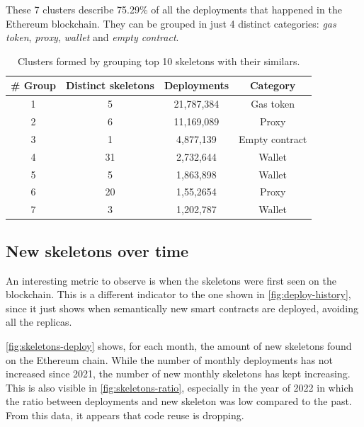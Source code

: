 These 7 clusters describe 75.29\% of all the deployments that happened in the Ethereum blockchain. They can be grouped in just 4 distinct categories: \textit{gas token}, \textit{proxy}, \textit{wallet} and \textit{empty contract}.

\begin{table}[H]
\centering
    \begin{threeparttable}
    \begin{tabular}{ c c c c } 
    \toprule
    \textbf{\# Group} & \textbf{Distinct skeletons} & \textbf{Deployments} & \textbf{Category} \\
    \midrule  
    1 & 5 & 21,787,384 & Gas token \\ [1.2ex]
    2 & 6 & 11,169,089 & Proxy \\ [1.2ex]
    3 & 1 & 4,877,139 & Empty contract \\ [1.2ex]
    4 & 31 & 2,732,644 & Wallet \\ [1.2ex]
    5 & 5 & 1,863,898 & Wallet \\ [1.2ex]
    6 & 20 & 1,55,2654 & Proxy \\ [1.2ex]
    7 & 3 & 1,202,787 & Wallet \\ [1.2ex]
    \bottomrule
    \end{tabular}
    \end{threeparttable}
    \caption{Clusters formed by grouping top 10 skeletons with their similars.}
    \label{table:top-skeletons-clusters}
\end{table}

\subsection{New skeletons over time}

An interesting metric to observe is when the skeletons were first seen on the blockchain. This is a different indicator to the one shown in \cref{fig:deploy-history}, since it just shows when semantically new smart contracts are deployed, avoiding all the replicas.

\cref{fig:skeletons-deploy} shows, for each month, the amount of new skeletons found on the Ethereum chain. While the number of monthly deployments has not increased since 2021, the number of new monthly skeletons has kept increasing. This is also visible in \cref{fig:skeletons-ratio}, especially in the year of 2022 in which the ratio between deployments and new skeleton was low compared to the past. From this data, it appears that code reuse is dropping. 

